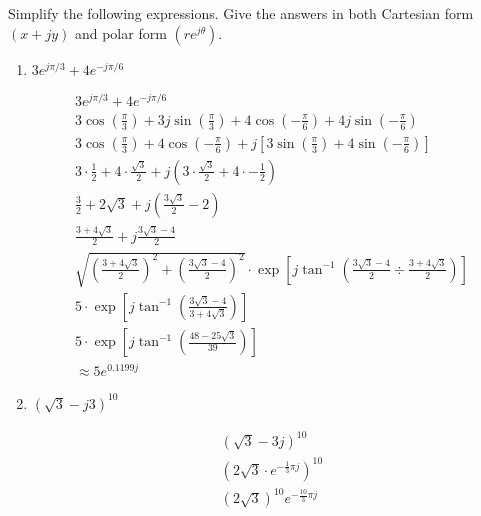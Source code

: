 \documentclass{zc-ust-hw}
\begin{document}
\maketitle

Simplify the following expressions. Give the answers in both Cartesian form
$(x+j y)$ and polar form $\left(r e^{j \theta}\right)$.
\begin{enumerate}
  \item $3 e^{j \pi / 3}+4 e^{-j \pi / 6}$
    \begin{sol}
      \begin{gather}
        3 e^{j \pi / 3}+4 e^{-j \pi / 6} \\
        3\cos \left( \frac{\pi}{3} \right) + 3j\sin \left( \frac{\pi}{3} \right) + 4\cos \left( -\frac{\pi}{6} \right) + 4j\sin \left( -\frac{\pi}{6} \right) \\
        3\cos \left( \frac{\pi}{3} \right) +4\cos \left( -\frac{\pi}{6} \right) + j \left[ 3\sin \left( \frac{\pi}{3} \right) +4\sin \left( -\frac{\pi}{6} \right)  \right] \\
        3\cdot \frac{1}{2} +4\cdot \frac{\sqrt{3}}{2} + j \left( 3\cdot \frac{\sqrt{3}}{2} +4\cdot -\frac{1}{2} \right) \\
        \frac{3}{2} +2\sqrt{3} + j \left( \frac{3\sqrt{3}}{2} -2 \right) \\
        \boxed{\frac{3+4\sqrt{3}}{2} + j \frac{3\sqrt{3}-4}{2}} \\
        \sqrt{\left( \frac{3+4\sqrt{3}}{2} \right)^2 + \left( \frac{3\sqrt{3}-4}{2} \right)^2}\cdot \exp \left[ j\tan ^{-1}\left( \frac{3\sqrt{3} -4}{2} \div \frac{3+4\sqrt{3} }{2} \right) \right] \\
        5 \cdot \exp \left[j \tan ^{-1}\left( \frac{3\sqrt{3} -4}{3+4\sqrt{3}}\right)\right] \\
        5 \cdot \exp \left[j \tan ^{-1}\left( \frac{48-25\sqrt{3} }{39}\right)\right] \\
        \boxed{\approx 5 e^{0.1199j}}
      \end{gather}
    \end{sol}
  \item $(\sqrt{3}-j 3)^{10}$
    \begin{sol}
      \begin{gather}
        \left( \sqrt{3} -3j \right) ^{10} \\
        \left( 2\sqrt{3}\cdot e^{-\frac{1}{3}\pi j} \right)^{10} \\
        \left( 2\sqrt{3}  \right) ^{10} e^{-\frac{10}{3}\pi j} \\

\end{gather}
\end{sol}
\end{enumerate}
\end{document}
